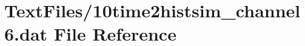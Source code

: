 \hypertarget{10time2histsim__channel6_8dat}{}\section{Text\+Files/10time2histsim\+\_\+channel6.dat File Reference}
\label{10time2histsim__channel6_8dat}
